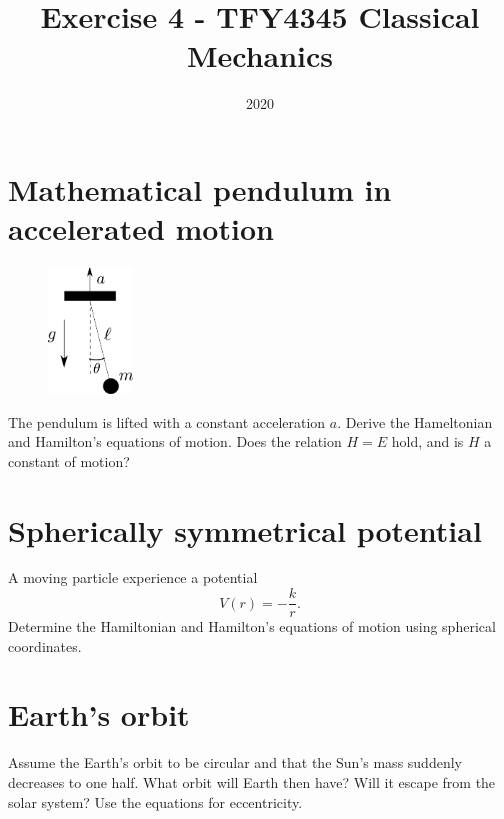 \documentclass{article}
\title{Exercise 4 - TFY4345 Classical Mechanics}
\date{2020}
\begin{document}
    \maketitle
    \section{Mathematical pendulum in accelerated motion} 
        \begin{figure}
            \vspace{-1cm}
            \includegraphics[width=0.2\textwidth]{figures/figure_1.pdf}
            \vspace{-2cm}
        \end{figure}
        The pendulum is lifted with a constant acceleration $a$. Derive the Hameltonian and Hamilton's equations of motion. Does the relation $H = E$ hold, and is $H$ a constant of motion?

    \section{Spherically symmetrical potential}
        A moving particle experience a potential 
        \begin{equation*}
            V(r) = -\frac{k}{r}.
        \end{equation*}
        Determine the Hamiltonian and Hamilton's equations of motion using spherical coordinates.

    \section{Earth's orbit}
        Assume the Earth's orbit to be circular and that the Sun's mass suddenly decreases to one half. What orbit will Earth then have? Will it escape from the solar system? Use the equations for eccentricity.
\end{document}
